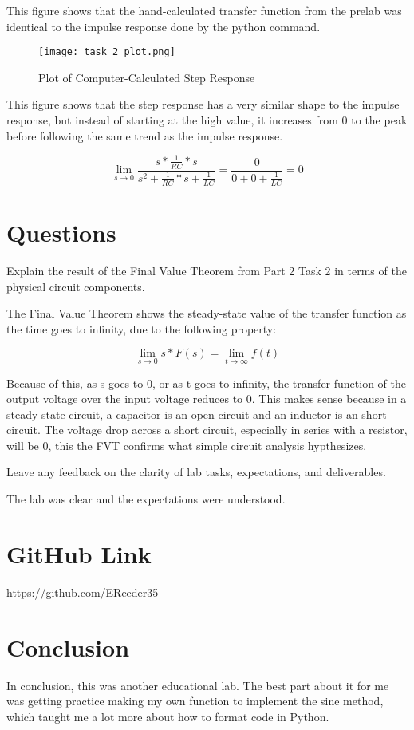 \documentclass[12pt]{article}
\begin{document}
This figure shows that the hand-calculated transfer function from the prelab was identical to the impulse response done by the python command.

\begin{figure}[h!]
    \centering
    \texttt{[image: task 2 plot.png]}
    \caption{Plot of Computer-Calculated Step Response}
\end{figure}

This figure shows that the step response has a very similar shape to the impulse response, but instead of starting at the high value, it increases from 0 to the peak before following the same trend as the impulse response.

\begin{equation}
    \lim_{s \to 0} \frac{s * \frac{1}{RC} * s}{s^2 + \frac{1}{RC}*s + \frac{1}{LC}} = \frac{0}{0 + 0 + \frac{1}{LC}} = 0
\end{equation}

\section{Questions}

Explain the result of the Final Value Theorem from Part 2 Task 2 in terms of the physical circuit components.

The Final Value Theorem shows the steady-state value of the transfer function as the time goes to infinity, due to the following property:

\begin{equation}
    \lim_{s \to 0} s*F(s) = \lim_{t \to \infty} f(t)
\end{equation}

Because of this, as s goes to 0, or as t goes to infinity, the transfer function of the output voltage over the input voltage reduces to 0. This makes sense because in a steady-state circuit, a capacitor is an open circuit and an inductor is an short circuit. The voltage drop across a short circuit, especially in series with a resistor, will be 0, this the FVT confirms what simple circuit analysis hypthesizes.

Leave any feedback on the clarity of lab tasks, expectations, and deliverables.

The lab was clear and the expectations were understood.

\section{GitHub Link}

https://github.com/EReeder35

\section{Conclusion}

In conclusion, this was another educational lab. The best part about it for me was getting practice making my own function to implement the sine method, which taught me a lot more about how to format code in Python.
\end{document}

